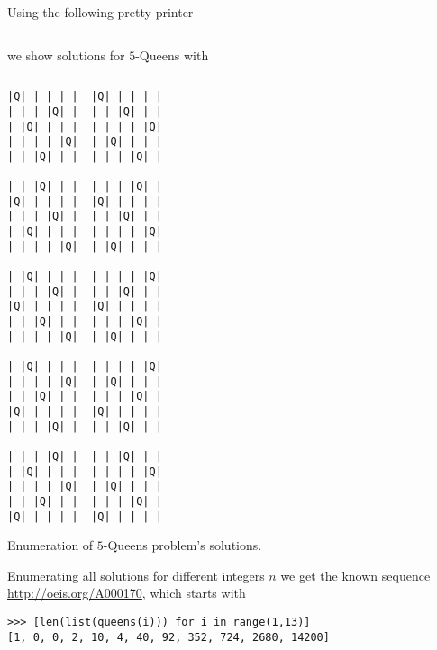 \begin{margintable}
Using the following pretty printer
\inputminted[fontsize=\footnotesize,firstline=35, lastline=44]{python}{backtracking/queens.py}
\noindent we show solutions for $5$-Queens with
\inputminted[fontsize=\footnotesize,]{python}{backtracking/5queens-enumeration-snippet.py}
\begin{verbatim}
|Q| | | | |  |Q| | | | |
| | | |Q| |  | | |Q| | |
| |Q| | | |  | | | | |Q|
| | | | |Q|  | |Q| | | |
| | |Q| | |  | | | |Q| |

| | |Q| | |  | | | |Q| |
|Q| | | | |  |Q| | | | |
| | | |Q| |  | | |Q| | |
| |Q| | | |  | | | | |Q|
| | | | |Q|  | |Q| | | |

| |Q| | | |  | | | | |Q|
| | | |Q| |  | | |Q| | |
|Q| | | | |  |Q| | | | |
| | |Q| | |  | | | |Q| |
| | | | |Q|  | |Q| | | |

| |Q| | | |  | | | | |Q|
| | | | |Q|  | |Q| | | |
| | |Q| | |  | | | |Q| |
|Q| | | | |  |Q| | | | |
| | | |Q| |  | | |Q| | |

| | | |Q| |  | | |Q| | |
| |Q| | | |  | | | | |Q|
| | | | |Q|  | |Q| | | |
| | |Q| | |  | | | |Q| |
|Q| | | | |  |Q| | | | |
\end{verbatim}
\caption{Enumeration of $5$-Queens problem's solutions.}
\end{margintable}

Enumerating all solutions for different integers $n$ we get the known sequence
\url{http://oeis.org/A000170}, which starts with
\begin{verbatim}
>>> [len(list(queens(i))) for i in range(1,13)]
[1, 0, 0, 2, 10, 4, 40, 92, 352, 724, 2680, 14200]
\end{verbatim}

